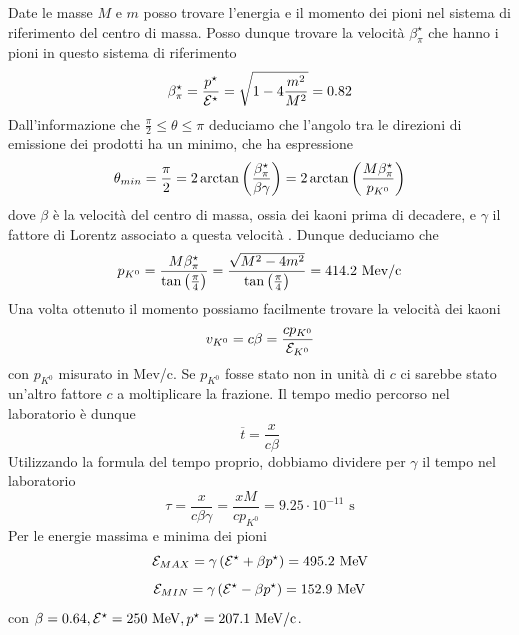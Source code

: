 \documentclass[12pt,twoside,a4]{article}
\begin{document}
\begin{solution}
Date le masse $M$ e $m$ posso trovare l'energia e il momento dei pioni nel sistema di riferimento del centro di massa. Posso dunque trovare la velocità  $\beta^\star_\pi$ che hanno i pioni in questo sistema di riferimento 
$$ \beta^\star_\pi = \frac{p^\star}{\mathcal{E}^\star} = \sqrt{1 - 4\frac{m^2}{M^2}} = 0.82$$
Dall'informazione che $\frac{\pi}{2} \leq \theta \leq \pi$ deduciamo che l'angolo tra le direzioni di emissione dei prodotti ha un minimo, che ha espressione
$$ \theta_{min} = \frac{\pi}{2} = 2 \arctan \left({\frac{\beta^\star_\pi}{\beta \gamma}}\right) = 2 \arctan \left({\frac{M \beta^\star_\pi}{p_{K^0}}}\right)$$
dove $\beta$ è la velocità  del centro di massa, ossia dei kaoni prima di decadere, e $\gamma$ il fattore di Lorentz associato a questa velocità . Dunque deduciamo che
$$ p_{K^0} = \frac{M \beta^\star_\pi}{\tan\left({\frac{\pi}{4}}\right)} = \frac{\sqrt{M^2 -4 m^2}}{\tan\left({\frac{\pi}{4}}\right)} = 414.2 \mbox{ Mev/c} $$
Una volta ottenuto il momento possiamo facilmente trovare la velocità  dei kaoni
$$ v_{K^0} = c \beta = \frac{c p_{K^0}}{\mathcal{E}_{K^0}}$$
con $p_{K^0}$ misurato in Mev/c. Se $p_{K^0}$ fosse stato non in unità  di $c$ ci sarebbe stato un'altro fattore $c$ a moltiplicare la frazione. Il tempo medio percorso nel laboratorio è dunque 
$$ \overline{t} = \frac{x}{c \beta} $$
Utilizzando la formula del tempo proprio, dobbiamo dividere per $\gamma$ il tempo nel laboratorio
$$ \tau  = \frac{x}{c \beta \gamma} = \frac{x M}{c p_{K^0}} = 9.25 \cdot 10^{-11} \mbox{ s}$$
Per le energie massima e minima dei pioni
$$ \mathcal{E}_{MAX} = \gamma \left({ \mathcal{E}^\star + \beta p^\star}\right) = 495.2 \mbox{ MeV}$$
$$ \mathcal{E}_{MIN} = \gamma \left({ \mathcal{E}^\star - \beta p^\star}\right) = 152.9 \mbox{ MeV}$$
con $\beta = 0.64, \mathcal{E}^\star = 250 \mbox{ MeV}, p^\star = 207.1 \mbox{ MeV/c}$.
\end{solution}
\end{document}
